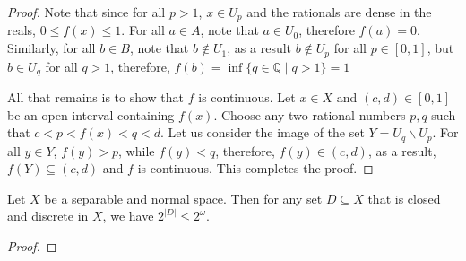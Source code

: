 \begin{proof}
    Note that since for all $p > 1$, $x\in U_p$ and the rationals are dense in the reals, $0\le f(x)\le 1$. For all $a\in A$, note that $a\in U_0$, therefore $f(a) = 0$. Similarly, for all $b\in B$, note that $b\notin U_1$, as a result $b\notin U_p$ for all $p\in[0,1]$, but $b\in U_q$ for all $q > 1$, therefore, $f(b) = \inf\{q\in\mathbb{Q}\mid q > 1\} = 1$

    All that remains is to show that $f$ is continuous. Let $x\in X$ and $(c,d)\in[0,1]$ be an open interval containing $f(x)$. Choose any two rational numbers $p,q$ such that $c < p < f(x) < q < d$. Let us consider the image of the set $Y = U_q\backslash\overline{U}_p$. For all $y\in Y$, $f(y) > p$, while $f(y) < q$, therefore, $f(y)\in(c,d)$, as a result, $f(Y)\subseteq (c,d)$ and $f$ is continuous. This completes the proof.
\end{proof}

\begin{lemma}[Jones]
    Let $X$ be a separable and normal space. Then for any set $D\subseteq X$ that is closed and discrete in $X$, we have $2^{|D|}\le 2^\omega$.
\end{lemma}
\begin{proof}
\end{proof}


